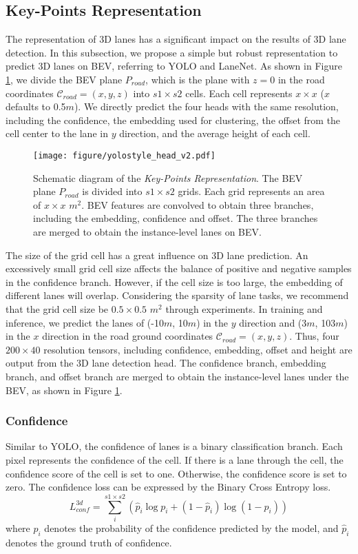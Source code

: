 \documentclass[10pt,twocolumn,letterpaper]{article}
\begin{document}
\subsection{Key-Points Representation}
The representation of 3D lanes has a significant impact on the results of 3D lane detection. In this subsection, we propose a simple but robust representation to predict 3D lanes on BEV, referring to YOLO\cite{redmon2016you} and LaneNet\cite{neven2018towards}. As shown in Figure \ref{fig:head}, we divide the BEV plane $P_{road}$, which is the plane with $z=0$ in the road coordinates $\mathcal{C}_{road}=\left(x,y,z\right)$ into $s1 \times s2$ cells. Each cell represents $x \times x$ ($x$ defaults to 0.5$m$). We directly predict the four heads with the same resolution, including the confidence, the embedding used for clustering, the offset from the cell center to the lane in $y$ direction, and the average height of each cell.
\begin{figure}
    \centering
\texttt{[image: figure/yolostyle\_head\_v2.pdf]}
      \caption{Schematic diagram of the \textit{Key-Points Representation}. The BEV plane $P_{road}$ is divided into $s1 \times s2$ grids. Each grid represents an area of $x \times x$ ${m^2}$. BEV features are convolved to obtain three branches, including the embedding, confidence and offset. The three branches are merged to obtain the instance-level lanes on BEV.}
    \label{fig:head}
\end{figure}
The size of the grid cell has a great influence on 3D lane prediction. An excessively small grid cell size affects the balance of positive and negative samples in the confidence branch. However, if the cell size is too large, the embedding of different lanes will overlap. Considering the sparsity of lane tasks, we recommend that the grid cell size be $0.5 \times 0.5$ ${m^2}$ through experiments. In training and inference, we predict the lanes of (-10$m$, 10$m$) in the $y$ direction and (3$m$, 103$m$) in the $x$ direction in the road ground coordinates $\mathcal{C}_{road}=\left(x,y,z\right)$. Thus, four $200 \times 40$ resolution tensors, including confidence, embedding, offset and height are output from the 3D lane detection head. The confidence branch, embedding branch, and offset branch are merged to obtain the instance-level lanes under the BEV, as shown in Figure \ref{fig:head}.

\subsubsection{Confidence}
Similar to YOLO\cite{redmon2016you}, the confidence of lanes is a binary classification branch. Each pixel represents the confidence of the cell. If there is a lane through the cell, the confidence score of the cell is set to one. Otherwise, the confidence score is set to zero. The confidence loss can be expressed by the Binary Cross Entropy loss.
\begin{equation}
L_{conf}^{3d} = \sum\limits_i^{s1 \times s2} {({{\hat p}_i}\log {p_i} + (1 - {{\hat p}_i})\log (1 - {p_i}))}
\end{equation}
where $p_i$ denotes the probability of the confidence predicted by the model, and ${\hat p}_i$ denotes the ground truth of confidence.
\end{document}
